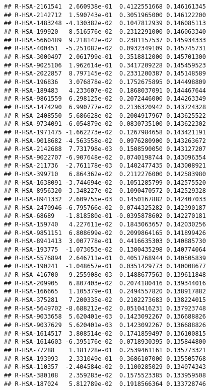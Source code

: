 \documentclass[
]{article}
\begin{document}
\begin{verbatim}
## R-HSA-2161541  2.660938e-01  0.4122551668 0.146161345
## R-HSA-2142712  1.590743e-01  0.3051965000 0.146122200
## R-HSA-1483248 -4.130382e-02  0.1047812939 0.146085113
## R-HSA-199920   8.516576e-02  0.2312291000 0.146063340
## R-HSA-5660489  9.218142e-02  0.2381157537 0.145934333
## R-HSA-400451  -5.251082e-02  0.0932349109 0.145745731
## R-HSA-3000497  2.061799e-01  0.3518812000 0.145701300
## R-HSA-9025106  1.962614e-01  0.3417209228 0.145459523
## R-HSA-2022857  8.797145e-02  0.2331200387 0.145148589
## R-HSA-196836   3.076878e-02  0.1752675895 0.144498809
## R-HSA-189483   4.233607e-02  0.1868037091 0.144467644
## R-HSA-9861559  6.298125e-02  0.2072446000 0.144263349
## R-HSA-1474290  6.990777e-02  0.2136320942 0.143724328
## R-HSA-2408550  5.686628e-02  0.2004917967 0.143625522
## R-HSA-9734091 -6.054879e-02  0.0830735100 0.143622302
## R-HSA-1971475 -1.662273e-02  0.1267984658 0.143421191
## R-HSA-9018682 -4.563558e-02  0.0976280900 0.143263672
## R-HSA-2142688  7.731798e-03  0.1508590050 0.143127207
## R-HSA-9022707 -6.907648e-02  0.0740198744 0.143096354
## R-HSA-211736  -2.761178e-03  0.1402477435 0.143008921
## R-HSA-399710   6.864362e-02  0.2112276000 0.142583980
## R-HSA-1638091 -3.744694e-02  0.1051285799 0.142575520
## R-HSA-8956320 -3.348227e-02  0.1090470572 0.142529328
## R-HSA-8941332  2.609755e-03  0.1450167882 0.142407033
## R-HSA-2470946 -6.795766e-02  0.0744325282 0.142390187
## R-HSA-68689   -1.818580e-01 -0.0395878602 0.142270181
## R-HSA-159740   4.227611e-02  0.1843063657 0.142030256
## R-HSA-9851151  6.808699e-02  0.2099864165 0.141899426
## R-HSA-8941413  3.007778e-01  0.4416635303 0.140885730
## R-HSA-193775  -1.073053e-02  0.1300435298 0.140774064
## R-HSA-5576894  2.646711e-01  0.4051768944 0.140505839
## R-HSA-190241  -1.048657e-01  0.0351429773 0.140008677
## R-HSA-416700   9.255908e-03  0.1488677563 0.139611848
## R-HSA-209905   6.807403e-02  0.2074180416 0.139344016
## R-HSA-166665   1.105379e-01  0.2494557820 0.138917882
## R-HSA-375281   7.200335e-02  0.2102273683 0.138224015
## R-HSA-5649702 -8.688212e-02  0.0510416231 0.137923748
## R-HSA-9033658  5.620401e-03  0.1423092267 0.136688826
## R-HSA-9037629  5.620401e-03  0.1423092267 0.136688826
## R-HSA-1614517  3.808514e-02  0.1741859497 0.136100815
## R-HSA-1614603 -6.395176e-02  0.0718930395 0.135844800
## R-HSA-77288    1.181728e-01  0.2539461161 0.135773321
## R-HSA-193993   2.331049e-01  0.3686107000 0.135505768
## R-HSA-110357  -2.404584e-02  0.1100285029 0.134074343
## R-HSA-380108   2.359283e-02  0.1575523385 0.133959508
## R-HSA-187024   5.812789e-02  0.1918566364 0.133728746

\end{verbatim}
\end{document}
